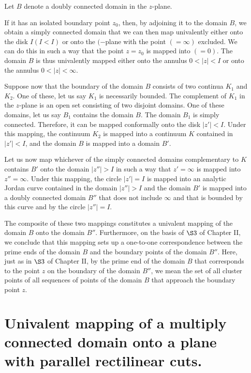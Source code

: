 \documentclass[
]{book}
\theoremstyle{definition}
\theoremstyle{definition}
\theoremstyle{definition}
\theoremstyle{definition}
\theoremstyle{remark}
\begin{document}
Let \(B\) denote a doubly connected domain in the \(z\)-plane.

If it has an isolated boundary point \(z_0\), then, by adjoining it to the domain \(B\), we obtain a simply connected domain that we can then map univalently either onto the disk \(I (I < I)\) or onto the \((-\)plane with the point \((= \infty)\) excluded. We can do this in such a way that the point \(z = z_0\) is mapped into \((= 0)\). The domain \(B\) is thus univalently mapped either onto the annulus \(0 < |z| < I\) or onto the annulus \(0 < |z| < \infty\).

Suppose now that the boundary of the domain \(B\) consists of two continua \(K_1\) and \(K_2\). One of these, let us say \(K_1\) is necessarily bounded. The complement of \(K_1\) in the \(z\)-plane is an open set consisting of two disjoint domains. One of these domains, let us say \(B_1\) contains the domain \(B\). The domain \(B_1\) is simply connected. Therefore, it can be mapped conformally onto the disk \(|z'| < I\). Under this mapping, the continuum \(K_2\) is mapped into a continuum \(K\) contained in \(|z' | < I\), and the domain \(B\) is mapped into a domain \(B'\).

Let us now map whichever of the simply connected domains complementary to \(K\) contains \(B'\) onto the domain \(|z''| > I\) in such a way that \(z' = \infty\) is mapped into \(z'' = \infty\). Under this mapping, the circle \(|z'| = I\) is mapped into an analytic Jordan curve contained in the domain \(|z''| > I\) and the domain \(B'\) is mapped into a doubly connected domain \(B''\) that does not include \(\infty\) and that is bounded by this curve and by the circle \(|z''| = I\).

The composite of these two mappings constitutes a univalent mapping of the domain \(B\) onto the domain \(B''\). Furthermore, on the basis of \(\S 3\) of Chapter II, we conclude that this mapping sets up a one-to-one correspondence between the prime ends of the domain \(B\) and the boundary points of the domain \(B''\). Here, just as in \(\S 3\) of Chapter II, by the prime end of the domain \(B\) that corresponds to the point \(z\) on the boundary of the domain \(B''\), we mean the set of all cluster points of all sequences of points of the domain \(B\) that approach the boundary point \(z\).

\section{Univalent mapping of a multiply connected domain onto a plane with parallel rectilinear cuts.}\label{univalent-mapping-of-a-multiply-connected-domain-onto-a-plane-with-parallel-rectilinear-cuts.}
\end{document}
